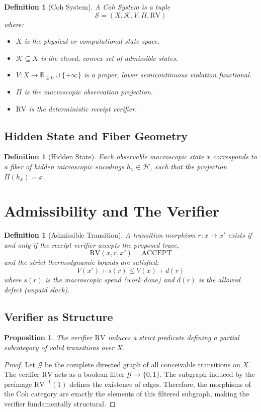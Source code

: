\documentclass[11pt]{article}
\newtheorem{definition}[theorem]{Definition}
\newtheorem{proposition}[theorem]{Proposition}
\begin{document}
\begin{definition}[Coh System]
A Coh System is a tuple 
\[
\mathcal{S} = (X, \mathcal{K}, V, \Pi, \mathrm{RV})
\]
where:
\begin{itemize}
\item $X$ is the physical or computational state space.
\item $\mathcal{K} \subseteq X$ is the closed, convex set of admissible states.
\item $V: X \to \mathbb{R}_{\ge 0} \cup \{+\infty\}$ is a proper, lower semicontinuous violation functional.
\item $\Pi$ is the macroscopic observation projection.
\item $\mathrm{RV}$ is the deterministic receipt verifier.
\end{itemize}
\end{definition}

\subsection{Hidden State and Fiber Geometry}

\begin{definition}[Hidden State]
Each observable macroscopic state $x$ corresponds to a fiber of hidden microscopic encodings $h_x \in \mathcal{H}$, such that the projection $\Pi(h_x) = x$.
\end{definition}

\section{Admissibility and The Verifier}

\begin{definition}[Admissible Transition]
A transition morphism $r: x \to x'$ exists if and only if the receipt verifier accepts the proposed trace,
\[
\mathrm{RV}(x, r, x') = \mathrm{ACCEPT}
\]
and the strict thermodynamic bounds are satisfied:
\[
V(x') + s(r) \le V(x) + d(r)
\]
where $s(r)$ is the macroscopic spend (work done) and $d(r)$ is the allowed defect (unpaid slack).
\end{definition}

\subsection{Verifier as Structure}

\begin{proposition}
The verifier $\mathrm{RV}$ induces a strict predicate defining a partial subcategory of valid transitions over $X$.
\end{proposition}
\begin{proof}
Let $\mathcal{G}$ be the complete directed graph of all conceivable transitions on $X$. The verifier $\mathrm{RV}$ acts as a boolean filter $\mathcal{G} \to \{0,1\}$. The subgraph induced by the preimage $\mathrm{RV}^{-1}(1)$ defines the existence of edges. Therefore, the morphisms of the Coh category are exactly the elements of this filtered subgraph, making the verifier fundamentally structural.
\end{proof}
\end{document}
